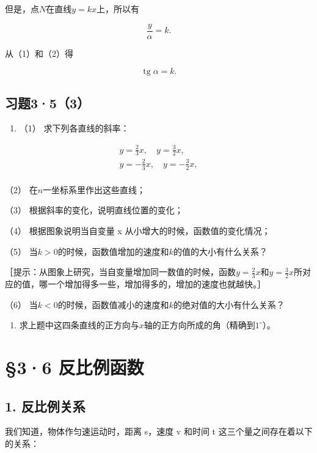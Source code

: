 但是，点\(N\)在直线\(y = kx\)上，所以有

\[
\frac{y}{\alpha} = k. \tag {2}
\]

从（1）和（2）得

\[
\operatorname{tg} \alpha = k.
\]

\subsection{习题3·5（3）}

\begin{enumerate}
\item
  （1） 求下列各直线的斜率：
\end{enumerate}

\[
\begin{array}{l} y = \frac{2}{3} x, \quad y = \frac{3}{2} x, \\ y = - \frac{2}{3} x, \quad y = - \frac{3}{2} x, \\ \end{array}
\]

（2） 在\(n\)一坐标系里作出这些直线；

（3） 根据斜率的变化，说明直线位置的变化；

（4） 根据图象说明当自变量 x 从小增大的时候，函数值的变化情况；

（5） 当\(k > 0\)的时候，函数值增加的速度和\(k\)的值的大小有什么关系？

［提示：从图象上研究，当自变量增加同一数值的时候，函数\(y = \frac{2}{3} x\)和\(y = \frac{3}{2} x\)所对应的值，哪一个增加得多一些，增加得多的，增加的速度也就越快。］

（6）
当\(k < 0\)的时候，函数值减小的速度和\(k\)的绝对值的大小有什么关系？

\begin{enumerate}[start=2]
\item
  求上题中这四条直线的正方向与\(x\)轴的正方向所成的角（精确到\(1^{\circ}\)）。
\end{enumerate}

\section{§3·6 反比例函数}

\subsection{1. 反比例关系}

我们知道，物体作匀速运动时，距离 s，速度 v 和时间 t
这三个量之间存在着以下的关系：

